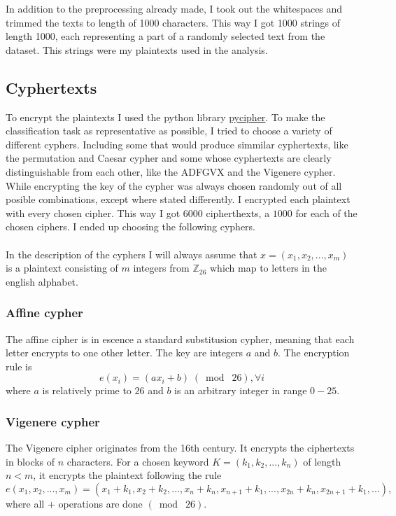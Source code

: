 \documentclass[a4paper]{article}
\begin{document}
In addition to the preprocessing already made, I took out the whitespaces and trimmed the texts to length of 1000 characters. This way I got 1000 strings of length 1000, each representing a part of a randomly selected text from the dataset. This strings were my plaintexts used in the analysis.

\subsection*{Cyphertexts}
To encrypt the plaintexts I used the python library \href{https://github.com/jameslyons/pycipher}{pycipher}. To make the classification task as representative as possible, I tried to choose a variety of different cyphers. Including some that would produce simmilar cyphertexts, like the permutation and Caesar cypher and some whose cyphertexts are clearly distinguishable from each other, like the ADFGVX and the Vigenere cypher. While encrypting the key of the cypher was always chosen randomly out of all posible combinations, except where stated differently. I encrypted each plaintext with every chosen cipher. This way I got $6000$ cipherthexts, a $1000$ for each of the chosen ciphers. I ended up choosing the following cyphers.\\
\\
In the description of the cyphers I will always assume that $x = (x_{1}, x_{2}, ...,x_{m})$ is a plaintext consisting of $m$ integers from $\mathbb{Z}_{26}$ which map to letters in the english alphabet.

\subsubsection*{Affine cypher}
The affine cipher is in escence a standard substitusion cypher, meaning that each letter encrypts to one other letter. The key are integers $a$ and $b$. The encryption rule is
$$e(x_{i}) = (ax_{i} + b) \;(\bmod\; 26), \forall i$$
where $a$ is relatively prime to $26$ and $b$ is an arbitrary integer in range $0-25$.


\subsubsection*{Vigenere cypher}
The Vigenere cipher originates from the 16th century. It encrypts the ciphertexts in blocks of $n$ characters. For a chosen keyword $K = (k_{1}, k_{2}, ..., k_{n})$ of length $n < m$, it encrypts the plaintext following the rule
$$e(x_{1}, x_{2}, ...,x_{m}) = (x_{1}+k_{1}, x_{2}+k_{2}, ..., x_{n}+k_{n}, x_{n+1}+k_{1}, ...,x_{2n}+k_{n}, x_{2n+1} + k_{1}, ...),$$
where all $+$ operations are done $(\bmod\; 26)$.
\end{document}
